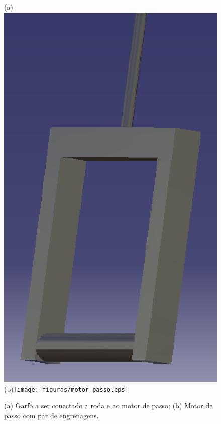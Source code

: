      \begin{figure}[!htbp]
                    	\begin{center}
                    		(a)\includegraphics[height=.3\textheight]{figuras/direcao2.eps}
                    		(b)\texttt{[image: figuras/motor\_passo.eps]}
                    		\caption{(a) Garfo a ser conectado a roda e ao motor de passo; (b) Motor de passo com par de engrenagens.}
                    	\end{center}
      \end{figure}
    
